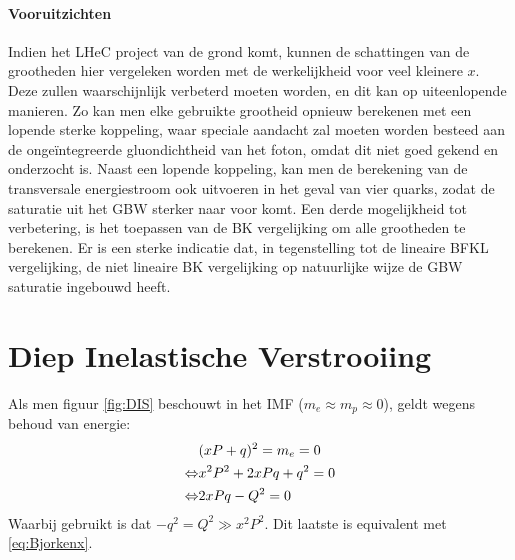 \documentclass[a4paper,11pt]{article}
\numberwithin{equation}{section} %
\begin{document}
      \paragraph{Vooruitzichten}
Indien het LHeC project van de grond komt, kunnen de schattingen van de grootheden hier vergeleken worden met de werkelijkheid voor veel kleinere $x$.
Deze zullen waarschijnlijk verbeterd moeten worden, en dit kan op uiteenlopende manieren.
Zo kan men elke gebruikte grootheid opnieuw berekenen met een lopende sterke koppeling, waar speciale aandacht zal moeten worden besteed aan de ongeïntegreerde gluondichtheid van het foton, omdat dit niet goed gekend en onderzocht is.
Naast een lopende koppeling, kan men de berekening van de transversale energiestroom ook uitvoeren in het geval van vier quarks, zodat de saturatie uit het GBW sterker naar voor komt.
Een derde mogelijkheid tot verbetering, is het toepassen van de BK vergelijking om alle grootheden te berekenen.
Er is een sterke indicatie \cite{Kutak} dat, in tegenstelling tot de lineaire BFKL vergelijking, de niet lineaire BK vergelijking op natuurlijke wijze de GBW saturatie ingebouwd heeft.

\newpage


\appendix
\section{Diep Inelastische Verstrooiing} \label{app:DIS}
Als men figuur \ref{fig:DIS} beschouwt in het IMF ($m_e \approx m_p \approx 0$), geldt wegens behoud van energie:
\begin{align}
&(xP+q)^2 = m_e = 0 \notag \\
\Leftrightarrow &x^2 P^2 + 2xPq + q^2 = 0 \notag \\
\Leftrightarrow &2xPq -Q^2=0
\end{align}
Waarbij gebruikt is dat $-q^2 = Q^2 \gg x^2P^2$. Dit laatste is equivalent met \eqref{eq:Bjorkenx}.
\end{document}
